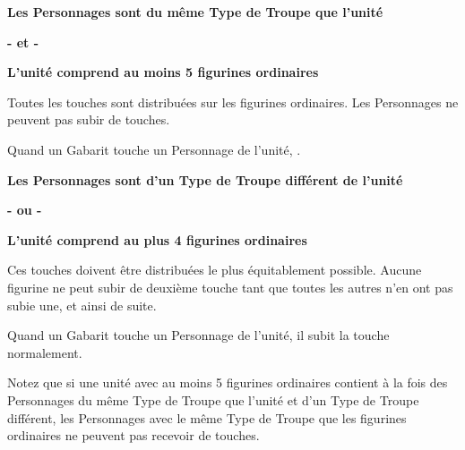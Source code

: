 \setlength\columnseprule{0.5pt}
\begin{multicols}{2}\raggedcolumns

\noindent
\begin{center}\textbf{Les Personnages sont du même Type de Troupe que l'unité}\end{center}
\vspace*{-0.8cm}\begin{center}\textbf{- et -}\end{center}
\vspace*{-0.8cm}\begin{center}\textbf{L'unité comprend au moins 5 figurines ordinaires}\end{center}

\noindent Toutes les touches sont distribuées sur les figurines ordinaires. Les Personnages ne peuvent pas subir de touches.

\noindent Quand un Gabarit touche un Personnage de l'unité, .

\columnbreak

\noindent
\begin{center}\textbf{Les Personnages sont d'un Type de Troupe différent de l'unité}\end{center}
\vspace*{-0.8cm}\begin{center}\textbf{- ou -}\end{center}
\vspace*{-0.8cm}\begin{center}\textbf{L'unité comprend au plus 4 figurines ordinaires}\end{center}

\noindent {} Ces touches doivent être distribuées le plus équitablement possible. Aucune figurine ne peut subir de deuxième touche tant que toutes les autres n'en ont pas subie une, et ainsi de suite.

\noindent Quand un Gabarit touche un Personnage de l'unité, il subit la touche normalement.

\end{multicols}
\setlength\columnseprule{0pt}

Notez que si une unité avec au moins 5 figurines ordinaires contient à la fois des Personnages du même Type de Troupe que l'unité et d'un Type de Troupe différent, les Personnages avec le même Type de Troupe que les figurines ordinaires ne peuvent pas recevoir de touches.

